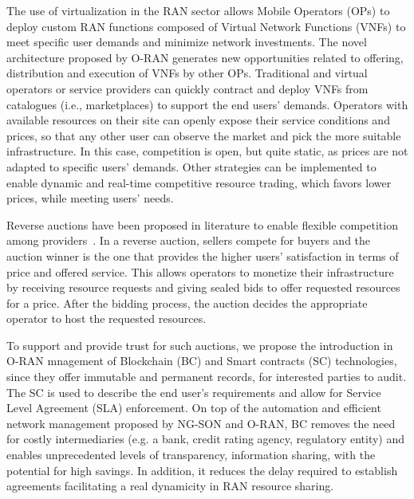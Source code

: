 \documentclass[journal]{IEEEtran}
\begin{document}
The use of virtualization in the RAN sector allows Mobile Operators (OPs) to deploy custom RAN functions composed of Virtual Network Functions (VNFs) to meet specific user demands and minimize network investments. The novel architecture proposed by O-RAN generates new opportunities related to offering, distribution and execution of VNFs by other OPs. Traditional and virtual operators or service providers can quickly contract and deploy VNFs from catalogues (i.e., marketplaces) to support the end users' demands. Operators with  available resources on their site can openly expose their service conditions and prices, so that any other user can observe the market and pick the more suitable infrastructure. In this case, competition is open, but quite static, as prices are not adapted to specific users' demands. Other strategies can be implemented to enable dynamic and real-time competitive resource trading, which favors lower prices, while meeting users' needs. 

Reverse auctions have been proposed in literature to enable flexible competition among providers~\cite{franco2019brain}. In a reverse auction, sellers compete for buyers and the auction winner is the one that provides the higher users' satisfaction in terms of price and offered service. This allows operators to monetize their infrastructure by receiving resource requests and giving sealed bids to offer requested resources for a price. After the bidding process, the auction decides the appropriate operator to host the requested resources. 

To support and provide trust for such auctions, we propose the introduction in O-RAN mnagement of Blockchain (BC) and Smart contracts (SC) technologies, since they offer immutable and permanent records, for interested parties to audit. The SC is used to describe the end user's requirements and allow for Service Level Agreement (SLA) enforcement. On top of the automation and efficient network management proposed by NG-SON and O-RAN, BC removes the need for costly intermediaries (e.g. a bank, credit rating agency, regulatory entity) and enables unprecedented levels of transparency, information sharing, with the potential for high savings. In addition, it reduces the delay required to establish agreements facilitating a real dynamicity in RAN resource sharing. 

\end{document}
